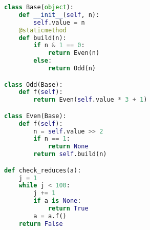 \begin{lstlisting}[language=Python, numbers=right]
class Base(object):
    def __init__(self, n):
        self.value = n
    @staticmethod
    def build(n):
        if n & 1 == 0:
            return Even(n)
        else:
            return Odd(n)

class Odd(Base):
    def f(self):
        return Even(self.value * 3 + 1)

class Even(Base):
    def f(self):
        n = self.value >> 2
        if n == 1:
            return None
        return self.build(n)

def check_reduces(a):
    j = 1
    while j < 100:
        j += 1
        if a is None:
            return True
        a = a.f()
    return False
\end{lstlisting}
